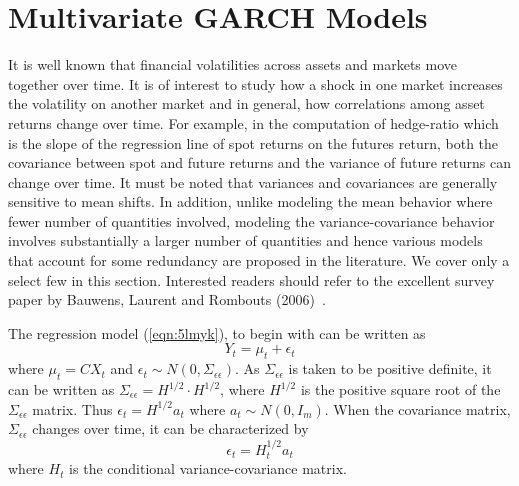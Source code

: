 \section{Multivariate GARCH Models}


It is well known that financial volatilities across assets and markets move together over time. It is of interest to study how a shock in one market increases the volatility on another market and in general, how correlations among asset returns change over time. For example, in the computation of hedge-ratio which is the slope of the regression line of spot returns on the futures return, both the covariance between spot and future returns and the variance of future returns can change over time. It must be noted that variances and covariances are generally sensitive to mean shifts. In addition, unlike modeling the mean behavior where fewer number of quantities involved, modeling the variance-covariance behavior involves substantially a larger number of quantities and hence various models that account for some redundancy are proposed in the literature. We cover only a select few in this section. Interested readers should refer to the excellent survey paper by Bauwens, Laurent and Rombouts (2006)~\cite{laurent}.


The regression model (\ref{eqn:5lmyk}), to begin with can be written as
	\begin{equation}\label{eqn:3relabel}
	Y_t= \mu_t+\epsilon_t
	\end{equation}
where $\mu_t=CX_t$ and $\epsilon_t \sim N(0,\Sigma_{\epsilon\epsilon})$. As $\Sigma_{\epsilon\epsilon}$ is taken to be positive definite, it can be written as $\Sigma_{\epsilon\epsilon}=H^{1/2} \cdot H^{1/2}$, where $H^{1/2}$ is the positive square root of the $\Sigma_{\epsilon\epsilon}$ matrix. Thus $\epsilon_t=H^{1/2}a_t$ where $a_t \sim N(0,I_m)$. When the covariance matrix, $\Sigma_{\epsilon\epsilon}$ changes over time, it can be characterized by
	\begin{equation}
	\epsilon_t=H^{1/2}_t a_t
	\end{equation}
where $H_t$ is the conditional variance-covariance matrix.


